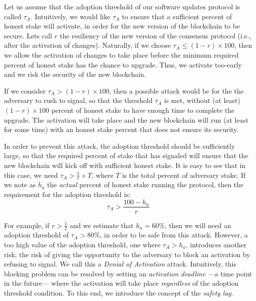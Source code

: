 Let us assume that the adoption threshold of our software updates protocol is called $\tau_A$. %
 Intuitively, we would like $\tau_A$ to ensure that a sufficient percent of honest stake will activate, in order for the new version of the blockchain to be secure. Lets call $r$ the resiliency
 of the new version of the consensus protocol (i.e., after the activation of changes). Naturally, if we choose $\tau_A \leq (1-r)\times100$, then we allow the activation of changes to take place before the minimum required percent of honest stake has the chance to upgrade. Thus, we activate too-early and we risk the security of the new blockchain. 

If we consider $\tau_A > (1-r)\times100$, then a possible attack would be for the the adversary to rush to signal, so that the threshold $\tau_A$ is met, without (at least) $(1-r) \times 100$ percent of honest stake to have enough time to complete the upgrade. The activation will take place and the new blockchain will run (at least for some time) with an honest stake percent that does not ensure its security. 

In order to prevent this attack, the adoption threshold should be sufficiently large, so that the required percent of stake that has signaled will ensure that the new blockchain will kick off with sufficient honest stake. It is easy to see that in this case, we need $\tau_A > \frac{1}{r} \times T$, where $T$ is the total percent of adversary stake. If we note as $h_a$ the \emph{actual} percent of honest stake running the protocol, then the requirement for the adoption threshold is:
\begin{equation} \label{tauA}
\tau_A > \frac{100 - h_a}{r}
\end{equation}

For example, if $r > \frac{1}{2}$ and we estimate that $h_a = 60\%$, then we will need an adoption threshold of $\tau_A > 80\% $, in order to be safe from this attack. However, a too high value of the adoption threshold, one where $\tau_A > h_a$, introduces another risk; the risk of  giving the opportunity to the adversary to block an activation by refusing to signal. We call this a \emph{Denial of Activation} attack. Intuitively, this blocking problem can be resolved by setting an \emph{activation deadline} ---a time point in the future--- where the activation will take place \emph{regardless} of the adoption threshold condition. To this end, we introduce the concept of the \emph{safety lag}.

